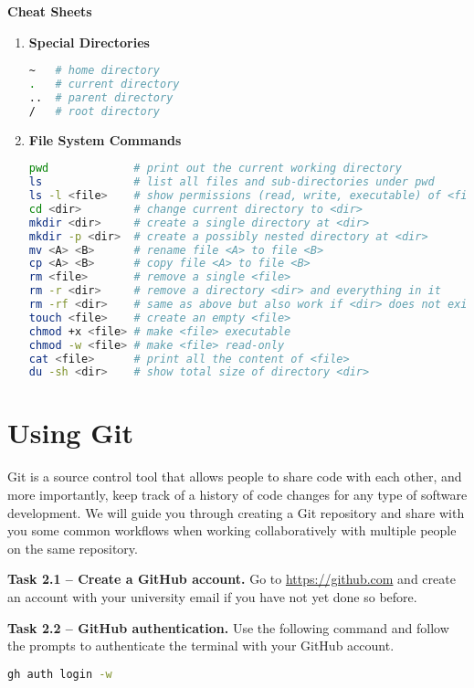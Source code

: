 \documentclass{article}
\begin{document}
{\bf Cheat Sheets}
\begin{enumerate}
\item {\bf Special Directories}
\begin{lstlisting}[language=sh]
~   # home directory
.   # current directory
..  # parent directory
/   # root directory
\end{lstlisting}

\item {\bf File System Commands}
\begin{lstlisting}[language=sh]
pwd             # print out the current working directory
ls              # list all files and sub-directories under pwd
ls -l <file>    # show permissions (read, write, executable) of <file>
cd <dir>        # change current directory to <dir>
mkdir <dir>     # create a single directory at <dir>
mkdir -p <dir>  # create a possibly nested directory at <dir>
mv <A> <B>      # rename file <A> to file <B>
cp <A> <B>      # copy file <A> to file <B>
rm <file>       # remove a single <file>
rm -r <dir>     # remove a directory <dir> and everything in it
rm -rf <dir>    # same as above but also work if <dir> does not exist
touch <file>    # create an empty <file>
chmod +x <file> # make <file> executable
chmod -w <file> # make <file> read-only
cat <file>      # print all the content of <file>
du -sh <dir>    # show total size of directory <dir>
\end{lstlisting}
\end{enumerate}

\section{Using Git}
Git is a source control tool that allows people to share code with each other, and more
importantly, keep track of a history of code changes for any type of software development.
We will guide you through creating a Git repository and share with you some common workflows
when working collaboratively with multiple people on the same repository.

{\bf Task 2.1 -- Create a GitHub account.} Go to \url{https://github.com} and create an
account with your university email if you have not yet done so before.

{\bf Task 2.2 -- GitHub authentication.} Use the following command and follow the prompts
to authenticate the terminal with your GitHub account.
\begin{lstlisting}[language=sh, numbers=none]
gh auth login -w
\end{lstlisting}
\end{document}
